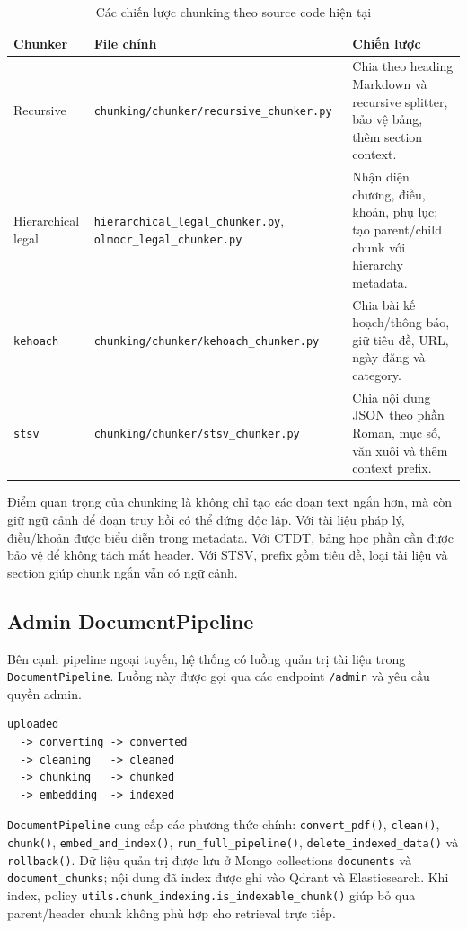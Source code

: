 \documentclass[../DoAn.tex]{subfiles}
\begin{document}
\begin{table}[h]
\centering
\begin{tabular}{|l|p{4.2cm}|p{5.7cm}|}
\hline
\textbf{Chunker} & \textbf{File chính} & \textbf{Chiến lược} \\
\hline
Recursive & \texttt{chunking/chunker/recursive\_chunker.py} & Chia theo heading
Markdown và recursive splitter, bảo vệ bảng, thêm section context. \\
\hline
Hierarchical legal & \texttt{hierarchical\_legal\_chunker.py},
\texttt{olmocr\_legal\_chunker.py} & Nhận diện chương, điều, khoản, phụ lục;
tạo parent/child chunk với hierarchy metadata. \\
\hline
\texttt{kehoach} & \texttt{chunking/chunker/kehoach\_chunker.py} & Chia bài kế
hoạch/thông báo, giữ tiêu đề, URL, ngày đăng và category. \\
\hline
\texttt{stsv} & \texttt{chunking/chunker/stsv\_chunker.py} & Chia nội dung JSON
theo phần Roman, mục số, văn xuôi và thêm context prefix. \\
\hline
\end{tabular}
\caption{Các chiến lược chunking theo source code hiện tại}
\end{table}

Điểm quan trọng của chunking là không chỉ tạo các đoạn text ngắn hơn, mà còn giữ
ngữ cảnh để đoạn truy hồi có thể đứng độc lập. Với tài liệu pháp lý, điều/khoản
được biểu diễn trong metadata. Với CTDT, bảng học phần cần được bảo vệ để không
tách mất header. Với STSV, prefix gồm tiêu đề, loại tài liệu và section giúp
chunk ngắn vẫn có ngữ cảnh.

\subsection{Admin DocumentPipeline}

Bên cạnh pipeline ngoại tuyến, hệ thống có luồng quản trị tài liệu trong
\texttt{DocumentPipeline}. Luồng này được gọi qua các endpoint \texttt{/admin}
và yêu cầu quyền admin.

\begin{verbatim}
uploaded
  -> converting -> converted
  -> cleaning   -> cleaned
  -> chunking   -> chunked
  -> embedding  -> indexed
\end{verbatim}

\texttt{DocumentPipeline} cung cấp các phương thức chính:
\texttt{convert\_pdf()}, \texttt{clean()}, \texttt{chunk()},
\texttt{embed\_and\_index()}, \texttt{run\_full\_pipeline()},
\texttt{delete\_indexed\_data()} và \texttt{rollback()}. Dữ liệu quản trị được
lưu ở Mongo collections \texttt{documents} và \texttt{document\_chunks}; nội dung
đã index được ghi vào Qdrant và Elasticsearch. Khi index, policy
\texttt{utils.chunk\_indexing.is\_indexable\_chunk()} giúp bỏ qua parent/header
chunk không phù hợp cho retrieval trực tiếp.
\end{document}
